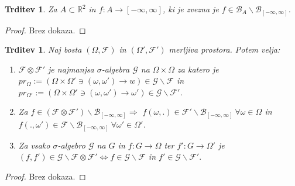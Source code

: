 \documentclass[a4paper,12pt]{article}
\theoremstyle{definition} %
\theoremstyle{plain} %
\newtheorem{trditev}[definicija]{Trditev}
\newcommand{\R}{\mathbb{R}}
\newcommand{\F}{\mathcal{F}}
\begin{document}
            \begin{trditev}
                Za $A \subset \R^2$ in $f:A \rightarrow [-\infty, \infty]$, ki je zvezna je $f \in \mathcal{B}_A\backslash\mathcal{B}_{[-\infty, \infty]}$.
            \end{trditev}

            \begin{proof}
                Brez dokaza.
            \end{proof}

            \begin{trditev}
                Naj bosta $(\Omega, \F)$ in $(\Omega', \F')$ merljiva prostora. Potem velja:
                \begin{enumerate}
                    \item $\F \otimes \F' $ je najmanjsa $\sigma$-algebra $\mathcal{G}$ na $\Omega \times \Omega$ za katero je \\
                     $pr_\Omega := (\Omega \times \Omega' \ni (\omega, \omega') \rightarrow w) \in \mathcal{G}\backslash\F$ in \\
                      $pr_{\Omega'} := (\Omega \times \Omega' \ni (\omega, \omega') \rightarrow \omega') \in \mathcal{G}\backslash\F'$.
                    \item Za $f \in (\F \otimes \F')\backslash\mathcal{B}_{[-\infty, \infty]} \Rightarrow$ $f(\omega, .) \in \F'\backslash\mathcal{B}_{[-\infty, \infty]} \ \forall \omega \in \Omega$ in $f(., \omega') \in \F\backslash\mathcal{B}_{[-\infty, \infty]} \ \forall \omega' \in \Omega'$.
                    \item Za vsako $\sigma$-algebro $\mathcal{G}$ na $G$ in $f: G \rightarrow \Omega$ ter $f':G \rightarrow \Omega'$ je $(f, f') \in \mathcal{G}\backslash\F\otimes\F' \iff f \in \mathcal{G}\backslash\F$ in $f'\in \mathcal{G}\backslash\F'.$
                \end{enumerate}
            \end{trditev}

            \begin{proof}
                Brez dokaza.
            \end{proof}
\end{document}
